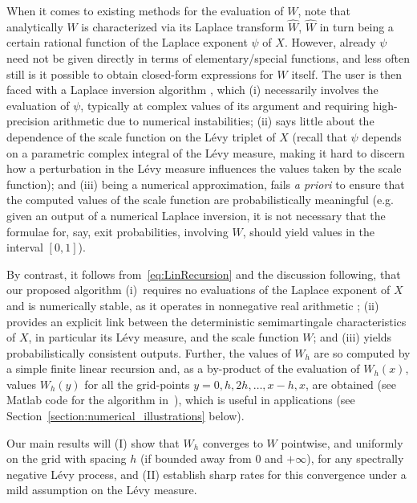 \documentclass[pdftex,oneside,11pt,reqno]{amsart}
\theoremstyle{definition}
\theoremstyle{theorem}
\theoremstyle{remark}
\numberwithin{equation}{section}
\numberwithin{definition}{section}
\begin{document}
When it comes to existing methods for the evaluation of ${W}$, note that analytically ${W}$ is characterized via its Laplace transform $\widehat{W}$, $\widehat{W}$ in turn being a certain rational function of the Laplace exponent $\psi$ of $X$. However, already $\psi$ need not be given directly in terms of elementary/special functions, and less often still is it possible to obtain closed-form expressions for ${W}$ itself. The user is then faced with a Laplace inversion algorithm  \cite{CohenAM} \cite[Chapter~5]{kuznetsovkyprianourivero}, which (i) necessarily involves the evaluation of $\psi$, typically at complex values of its argument and requiring high-precision arithmetic due to numerical instabilities; (ii) says little about the dependence of the scale function on the L\'evy triplet of $X$ (recall that $\psi$ depends on a parametric complex integral of the L\'evy measure, making it hard to discern how a perturbation in the L\'evy measure influences the values taken by the scale function); and (iii) being a numerical approximation, fails \emph{a priori} to ensure that the computed values of the scale function are probabilistically meaningful (e.g. given an output of a numerical Laplace inversion, it is not necessary that the formulae for, say, exit probabilities, involving $W$, should yield values in the interval $[0,1]$).

By contrast, it follows from~\eqref{eq:LinRecursion} and the discussion following, that our proposed algorithm (i)~requires no evaluations of the Laplace exponent of $X$ and is numerically stable, as it operates in nonnegative real arithmetic \cite[Theorem~7]{panjer}; (ii) provides an explicit link between the deterministic semimartingale characteristics of $X$, in particular its L\'evy measure,  
and the scale function $W$; and (iii) yields probabilistically consistent outputs. Further, the values of ${W}_h$ are so computed by a simple finite linear recursion and, as a by-product of the evaluation of $W_h(x)$, values $W_h(y)$ for all the grid-points $y=0,h,2h,\ldots,x-h,x$, are obtained (see Matlab code for the algorithm in~\cite{Scale_Function_Code}), which is useful in applications (see Section~\ref{section:numerical_illustrations} below). 

Our main results will (I) show that ${W}_h$ converges to ${W}$ pointwise, and uniformly on the grid with spacing $h$ (if bounded away from $0$ and $+\infty$), for any spectrally negative L\'evy process,
and (II) establish sharp rates for this convergence under a mild assumption on the L\'evy measure.
\end{document}

